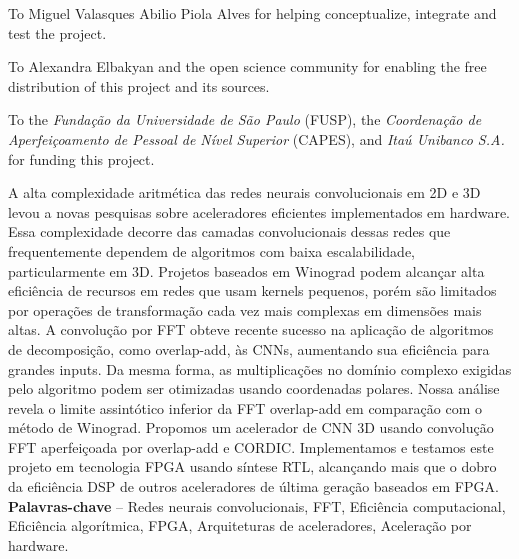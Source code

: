 \documentclass[normalnum]{politex}
\begin{document}

\begin{agradecimentos}
  To Miguel Valasques Abilio Piola Alves for helping conceptualize, integrate and test the project.
  
  To Alexandra Elbakyan and the open science community for enabling the free distribution of this project and its sources.

  To the \textit{Fundação da Universidade de São Paulo} (FUSP), the  \textit{Coordenação de Aperfeiçoamento de Pessoal de Nível Superior} (CAPES), and \textit{Itaú Unibanco S.A.} for funding this project.
\end{agradecimentos}


\begin{resumo}
  A alta complexidade aritmética das redes neurais convolucionais em 2D e 3D levou a novas pesquisas sobre aceleradores eficientes implementados em hardware. Essa complexidade decorre das camadas convolucionais dessas redes que frequentemente dependem de algoritmos com baixa escalabilidade, particularmente em 3D. Projetos baseados em Winograd podem alcançar alta eficiência de recursos em redes que usam kernels pequenos, porém são limitados por operações de transformação cada vez mais complexas em dimensões mais altas. A convolução por FFT obteve recente sucesso na aplicação de algoritmos de decomposição, como overlap-add, às CNNs, aumentando sua eficiência para grandes inputs. Da mesma forma, as multiplicações no domínio complexo exigidas pelo algoritmo podem ser otimizadas usando coordenadas polares. Nossa análise revela o limite assintótico inferior da FFT overlap-add em comparação com o método de Winograd. Propomos um acelerador de CNN 3D usando convolução FFT aperfeiçoada por overlap-add e CORDIC. Implementamos e testamos este projeto em tecnologia FPGA usando síntese RTL, alcançando mais que o dobro da eficiência DSP de outros aceleradores de última geração baseados em FPGA.
  \\[3\baselineskip]
  \textbf{Palavras-chave} -- Redes neurais convolucionais, FFT, Eficiência computacional, Eficiência algorítmica, FPGA, Arquiteturas de aceleradores, Aceleração por hardware.
\end{resumo}
\end{document}

